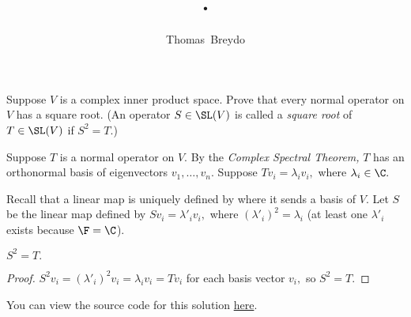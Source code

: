 \documentclass{amsart}
\title{\pagenum.\probnum}
\author{Thomas\ Breydo}
\newcommand{\pagenum}{223}
\newcommand{\probnum}{9}
\begin{document}
\maketitle

\begin{problem*}
Suppose $V$ is a complex inner product space. Prove
that every normal operator on $V$ has a square root.
(An operator $S\in\SL(V)$ is called a \textit{square root}
of $T\in\SL(V)$ if $S^2=T.$)
\end{problem*}

\vspace{0.5in}

Suppose $T$ is a normal operator on $V.$ By the
\textit{Complex Spectral Theorem,} $T$ has
an orthonormal basis of eigenvectors $v_1,\dots,v_n.$
Suppose $Tv_i=\lambda_iv_i,$ where $\lambda_i\in\C.$

Recall that a linear map is uniquely defined by where
it sends a basis of $V.$ Let $S$ be the linear map defined by
$Sv_i=\lambda'_iv_i,$ where $(\lambda'_i)^2=\lambda_i$ (at least
one $\lambda'_i$ exists because $\F=\C$).
\begin{claim*}
$S^2=T.$
\end{claim*}
\begin{proof}
$S^2v_i=(\lambda'_i)^2v_i=\lambda_iv_i=Tv_i$
for each basis vector $v_i,$ so $S^2=T.$
\end{proof}

\vspace{0.5in}

\begin{note*}
You can view the source code for this solution
\href{https://github.com/thomasbreydo/linalg/blob/main/\pagenum_\probnum_Thomas_Breydo.tex}
{here}.
\end{note*}
\end{document}
